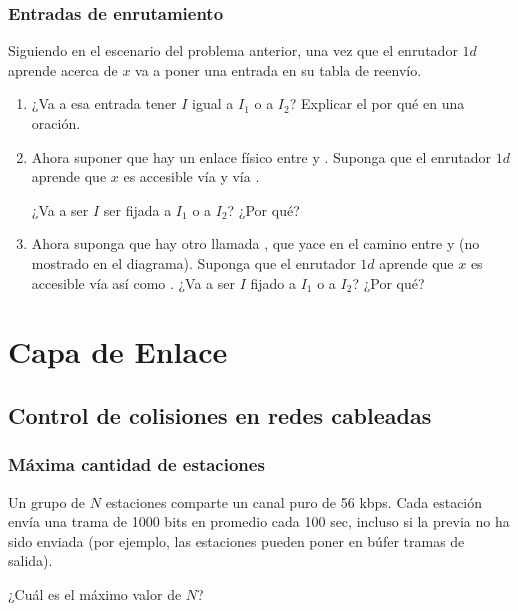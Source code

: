 \documentclass[12pt]{report}
\begin{document}
\begin{exer}
	\subsection{Entradas de enrutamiento \sthree}

	Siguiendo en el escenario del problema anterior, una vez que el enrutador $1d$ aprende acerca de $x$ va a poner una entrada  en su tabla de reenvío.

	\begin{enumerate}
		\item ¿Va a esa entrada tener $I$ igual a $I_1$ o a $I_2$? Explicar el por qué en una oración.
		\item Ahora suponer que hay un enlace físico entre  y . Suponga que el enrutador $1d$ aprende que $x$ es accesible vía  y vía .

		      ¿Va a ser $I$ ser fijada a $I_1$ o a $I_2$? ¿Por qué?
		\item Ahora suponga que hay otro  llamada , que yace en el camino entre  y 
		      (no mostrado en el diagrama). Suponga que el enrutador $1d$ aprende que $x$ es accesible vía
		       así como . ¿Va a ser $I$ fijado a $I_1$ o a $I_2$? ¿Por qué?
	\end{enumerate}
\end{exer}

%
%


\chapter{Capa de Enlace}
\begin{exer}
	\section{Control de colisiones en redes cableadas}
	\subsection{Máxima cantidad de estaciones \sthree}
	Un grupo de $N$ estaciones comparte un canal  puro de 56 kbps. Cada estación envía una trama de 1000 bits en promedio cada 100 sec, incluso si la previa no ha sido enviada (por ejemplo, las estaciones pueden poner en búfer tramas de salida).

	¿Cuál es el máximo valor de $N$?
\end{exer}
\end{document}
